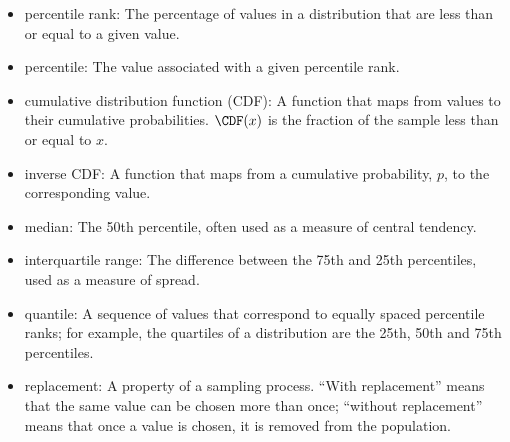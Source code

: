 \begin{itemize}

\item percentile rank: The percentage of values in a distribution that are
less than or equal to a given value.

\item percentile: The value associated with a given percentile rank.

\item cumulative distribution function (CDF): A function that maps
  from values to their cumulative probabilities.  $\CDF(x)$ is the
  fraction of the sample less than or equal to $x$.  

\item inverse CDF: A function that maps from a cumulative probability,
  $p$, to the corresponding value.

\item median: The 50th percentile, often used as a measure of central
  tendency.  

\item interquartile range: The difference between
the 75th and 25th percentiles, used as a measure of spread.

\item quantile: A sequence of values that correspond to equally spaced
percentile ranks; for example, the quartiles of a distribution are
the 25th, 50th and 75th percentiles.

\item replacement: A property of a sampling process. ``With replacement''
means that the same value can be chosen more than once; ``without
replacement'' means that once a value is chosen, it is removed from
the population.

\end{itemize}

